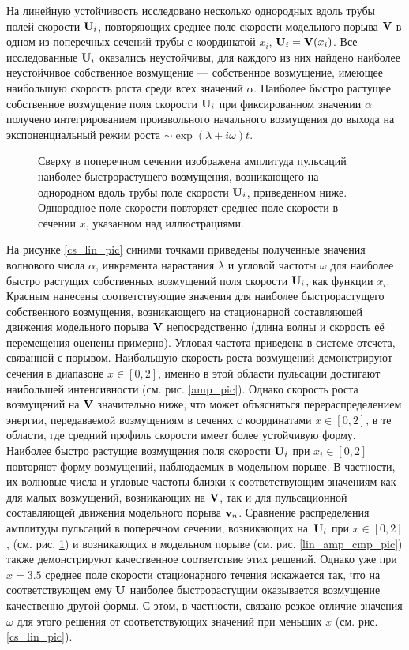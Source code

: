 На линейную устойчивость исследовано несколько однородных вдоль трубы полей скорости $\mathbf{U}_i$, повторяющих среднее поле скорости модельного порыва $\mathbf{V}$ в одном из поперечных сечений трубы с координатой $x_i$, $\mathbf{U}_i=\mathbf{V}(x_i)$. Все исследованные $\mathbf{U}_i$ оказались неустойчивы, для каждого из них найдено наиболее неустойчивое собственное возмущение --- собственное возмущение, имеющее наибольшую скорость роста среди всех значений $\alpha$. Наиболее быстро растущее собственное возмущение поля скорости $\mathbf{U}_i$ при фиксированном значении $\alpha$ получено интегрированием произвольного начального возмущения до выхода на экспоненциальный режим роста $\sim \exp(\lambda + i\omega) t$. 

\begin{figure}
\caption{Сверху в поперечном сечении изображена амплитуда пульсаций наиболее быстрорастущего возмущения, возникающего на однородном вдоль трубы поле скорости $\mathbf{U}_i$, приведенном ниже. Однородное поле скорости повторяет среднее поле скорости в сечении $x$, указанном над иллюстрациями.}
\label{cs_lin_map_pic}
\end{figure}

На рисунке \ref{cs_lin_pic} синими точками приведены полученные значения волнового числа $\alpha$, инкремента нарастания $\lambda$ и угловой частоты $\omega$ для наиболее быстро растущих собственных возмущений поля скорости $\mathbf{U}_i$, как функции $x_i$. Красным нанесены соответствующие значения для наиболее быстрорастущего собственного возмущения, возникающего на стационарной составляющей движения модельного порыва $\mathbf{V}$ непосредственно (длина волны и скорость её перемещения оценены примерно). Угловая частота приведена в системе отсчета, связанной с порывом. Наибольшую скорость роста возмущений демонстрируют сечения в диапазоне $x \in [0, 2]$, именно в этой области пульсации достигают наибольшей интенсивности (см. рис. \ref{amp_pic}). Однако скорость роста возмущений на $\mathbf{V}$ значительно ниже, что может объясняться перераспределением энергии, передаваемой возмущениям в сеченях с координатами $x \in [0, 2]$, в те области, где средний профиль скорости имеет более устойчивую форму. Наиболее быстро растущие возмущения поля скорости $\mathbf{U}_i$ при $x_i \in [0,2]$ повторяют форму возмущений, наблюдаемых в модельном порыве. В частности, их волновые числа и угловые частоты близки к соответствующим значениям как для малых возмущений, возникающих на $\mathbf{V}$, так и для пульсационной составляющей движения модельного порыва $\mathbf{v}_n$. Сравнение распределения амплитуды пульсаций в поперечном сечении, возникающих на~$\mathbf{U}_i$ при $x \in [0,2]$, (см. рис. \ref{cs_lin_map_pic}) и возникающих в модельном порыве (см. рис. \ref{lin_amp_cmp_pic}) также демонстрируют качественное соответствие этих решений. Однако уже при $x = 3.5$ среднее поле скорости стационарного течения искажается так, что на соответствующем ему $\mathbf{U}$ наиболее быстрорастущим оказывается возмущение качественно другой формы. С этом, в частности, связано резкое отличие значения $\omega$ для этого решения от соответствующих значений при меньших $x$ (см. рис. \ref{cs_lin_pic}). 

